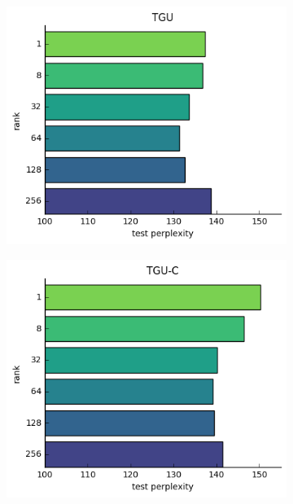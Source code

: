 \begin{figure}[ht]
\centering
\begin{subfigure}[t]{0.45\textwidth}
	\includegraphics[width=\textwidth]{exps/ptb/tgu-rank}
\end{subfigure}\hfill
\begin{subfigure}[t]{0.45\textwidth}
	\includegraphics[width=\textwidth]{exps/ptb/tguc-rank}
\end{subfigure}\\
\begin{subfigure}[t]{0.45\textwidth}

\end{subfigure}
\end{figure}
